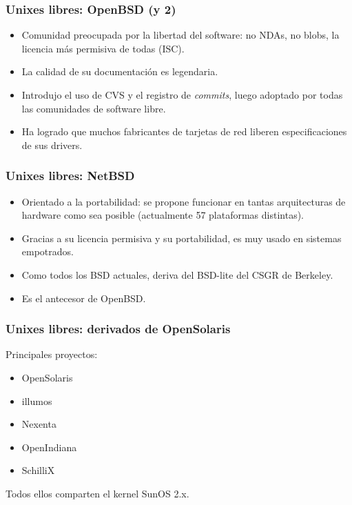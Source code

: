 \documentclass{beamer}
\begin{document}

\begin{frame}
\frametitle{Unixes libres: OpenBSD (y 2)}


\begin{itemize}
\item Comunidad preocupada por la libertad del software: no NDAs, no blobs, la licencia más permisiva de todas (ISC). 
\item La calidad de su documentación es legendaria.
\item Introdujo el uso de CVS y el registro de \textit{commits}, luego adoptado por todas las comunidades de software libre. 
\item Ha logrado que muchos fabricantes de tarjetas de red liberen especificaciones de sus drivers.

\end{itemize}


\end{frame}



\begin{frame}
\frametitle{Unixes libres: NetBSD}

\begin{itemize}
\item Orientado a la portabilidad: se propone funcionar en tantas arquitecturas de hardware 
como sea posible (actualmente 57 plataformas distintas).
\item Gracias a su licencia permisiva y su portabilidad, es muy usado en sistemas empotrados.
\item Como todos los BSD actuales, deriva del BSD-lite del CSGR de Berkeley.
\item Es el antecesor de OpenBSD.
\end{itemize}

\end{frame}




\begin{frame}
\frametitle{Unixes libres: derivados de OpenSolaris}

Principales proyectos:

\begin{itemize}
\item OpenSolaris
\item illumos
\item Nexenta
\item OpenIndiana
\item SchilliX
\end{itemize}

Todos ellos comparten el kernel SunOS 2.x.


\end{frame}
\end{document}
